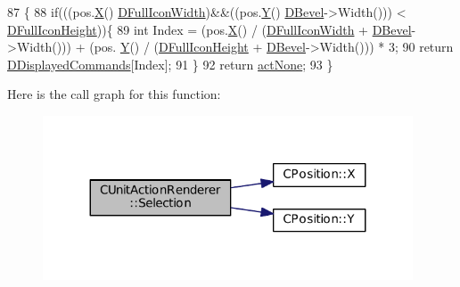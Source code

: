 \begin{DoxyCode}
87                                                                              \{
88     \textcolor{keywordflow}{if}(((pos.\hyperlink{classCPosition_a9a6b94d3b91df1492d166d9964c865fc}{X}() %
      \hyperlink{classCUnitActionRenderer_a67e5c1650ef8f849c05d9f059d12fb95}{DFullIconWidth})&&((pos.\hyperlink{classCPosition_a1aa8a30e2f08dda1f797736ba8c13a87}{Y}() %
      \hyperlink{classCUnitActionRenderer_a3f4012557f7f4d71cfa02df725984ebb}{DBevel}->Width())) < \hyperlink{classCUnitActionRenderer_a11b30763b92ed0cbfb842f86fe76fe26}{DFullIconHeight}))\{
89         \textcolor{keywordtype}{int} Index = (pos.\hyperlink{classCPosition_a9a6b94d3b91df1492d166d9964c865fc}{X}() / (\hyperlink{classCUnitActionRenderer_a67e5c1650ef8f849c05d9f059d12fb95}{DFullIconWidth} + \hyperlink{classCUnitActionRenderer_a3f4012557f7f4d71cfa02df725984ebb}{DBevel}->Width())) + (pos.
      \hyperlink{classCPosition_a1aa8a30e2f08dda1f797736ba8c13a87}{Y}() / (\hyperlink{classCUnitActionRenderer_a11b30763b92ed0cbfb842f86fe76fe26}{DFullIconHeight} + \hyperlink{classCUnitActionRenderer_a3f4012557f7f4d71cfa02df725984ebb}{DBevel}->Width())) * 3;
90         \textcolor{keywordflow}{return} \hyperlink{classCUnitActionRenderer_a194c87c9f3280485f4abceb8d39853b3}{DDisplayedCommands}[Index];
91     \}
92     \textcolor{keywordflow}{return} \hyperlink{GameDataTypes_8h_a35b98ce26aca678b03c6f9f76e4778ceaa8df154ad276f6f62054e9b5b0696f92}{actNone};
93 \}
\end{DoxyCode}
Here is the call graph for this function\+:
\nopagebreak
\begin{figure}[H]
\begin{center}
\leavevmode
\includegraphics[width=311pt]{classCUnitActionRenderer_a41108fd092035a22f7ecd75b18f045a7_cgraph}
\end{center}
\end{figure}


